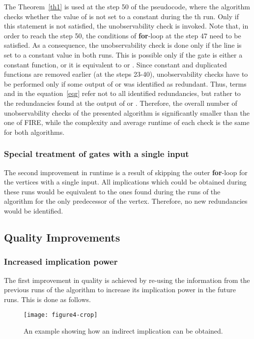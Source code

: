 \documentclass[conference]{IEEEtran} \usepackage{times}
\begin{document}
The Theorem~\ref{th1} is used at the step 50 of the pseudocode, where
the algorithm checks whether the value of  is not set to a constant
during the th run. Only if this statement is not satisfied, the
unobservability check 
is invoked.  Note that, in order to reach the step 50, the
conditions of {\bf for}-loop at the step 47 need to be satisfied.  As a
consequence, the unobservability check is done only if the line
 is set to a constant value in both runs.  This is possible
only if the gate  is either a constant function, or it is
equivalent to  or .  Since constant and
duplicated functions are removed earlier (at the steps 23-40),
unobservability checks have to be performed only if some output of
 or  was identified as redundant.
Thus, terms  and  in
the equation~\ref{eqr} refer not to all identified redundancies, but
rather to the redundancies found at the output of  or
.  Therefore, the overall number of
unobservability checks of the presented algorithm is significantly smaller than the
one of FIRE, while the complexity and average runtime of each check is
the same for both algorithms.


\subsubsection{Special treatment of gates with a single input} \label{r2}

The second improvement in runtime is a result of skipping the outer
{\bf for}-loop for the vertices with a single input.  All implications
which could be obtained during these runs would be equivalent to the
ones found during the runs of the algorithm for the only predecessor of
the vertex.  Therefore, no new redundancies would be identified.

\subsection{Quality Improvements}

\subsubsection{Increased implication power} \label{q1}

The first improvement in quality is achieved by re-using the
information from the previous runs of the algorithm to increase its
implication power in the future runs. This is done as follows.

\begin{figure}[t!]
\begin{center}
\texttt{[image: figure4-crop]}
\caption{An example showing how an indirect implication can be obtained.} \label{ex2}
\end{center}
\end{figure}
\end{document}
